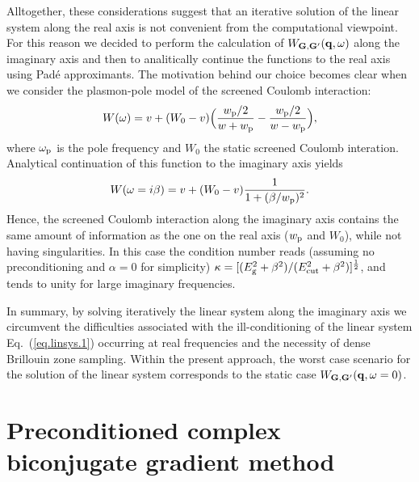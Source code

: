 \documentclass[twocolumn,prb,showpacs,superscriptaddress]{revtex4}
\def\w{\omega}
\def\q{{\bf q}}
\def\G{{\bf G}}
\def\Gp{{\bf G^\prime}}
\begin{document}
Alltogether, these considerations suggest that an iterative solution of the
linear system along the real axis is not convenient from the computational
viewpoint. For this reason we decided to perform the calculation of $W_{\G,\Gp}(\q,\w)$
along the imaginary axis and then to analitically continue the functions
to the real axis using Pad\'e approximants.\cite{pade1,pade2,pade3}
The motivation behind our choice becomes clear when we consider the
plasmon-pole model of the screened Coulomb interaction:\cite{hl86}
  \begin{equation}
  W(\w) = v + (W_0 -v) \Big( \frac{w_{\rm p}/2}{w+w_{\rm p}} - \frac{w_{\rm p}/2}{w-w_{\rm p}} \Big),
  \end{equation}
where $\w_{\rm p}$ is the pole frequency and $W_0$ the static screened Coulomb interation.
Analytical continuation of this function to the imaginary axis yields
  \begin{equation} \label{eq.pp.im}
  W(\w=i\beta) = v + (W_0 -v) \frac{1}{1+(\beta/w_{\rm p})^2}.
  \end{equation}
Hence, the screened Coulomb interaction along the imaginary axis contains the same
amount of information as the one on the real axis ($w_{\rm p}$ and $W_0$), while
not having singularities. In this case the condition number reads
(assuming no preconditioning and $\alpha=0$ for simplicity) 
$\kappa=[(E_{\rm g}^2+\beta^2)/(E_{\rm cut}^2+\beta^2)]^\frac{1}{2}$,
and tends to unity for large imaginary frequencies.

In summary, by solving iteratively the linear system along the imaginary
axis we circumvent the difficulties associated with the ill-conditioning
of the linear system Eq.\ (\ref{eq.linsys.1}) occurring at real frequencies
and the necessity of dense Brillouin zone sampling.
Within the present approach, the worst case scenario for the solution 
of the linear system corresponds to the static case $W_{\G,\Gp}(\q,\w=0)$.

\section{Preconditioned complex biconjugate gradient method}
\end{document}
